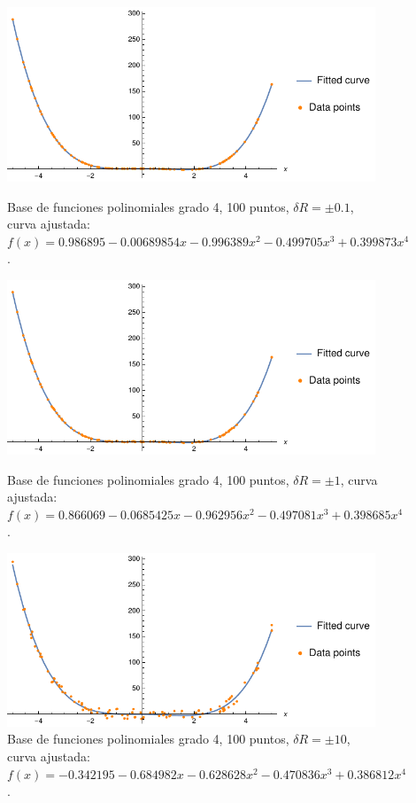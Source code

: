 \documentclass[11pt,letterpaper]{article}
\begin{document}
\begin{figure}
\centering
\includegraphics[width=11cm]{poly_04}
\caption{Base de funciones polinomiales grado 4, 100 puntos, $\delta R=\pm 0.1$,
curva ajustada: $f(x)=0.986895 - 0.00689854 x - 0.996389 x^2 - 0.499705 x^3 + 0.399873 x^4$.}
\includegraphics[width=11cm]{poly_05}
\caption{Base de funciones polinomiales grado 4, 100 puntos, $\delta R=\pm 1$,
curva ajustada: $f(x)=0.866069 - 0.0685425 x - 0.962956 x^2 - 0.497081 x^3 + 0.398685 x^4$.}
\includegraphics[width=11cm]{poly_06}
\caption{Base de funciones polinomiales grado 4, 100 puntos, $\delta R=\pm 10$,
curva ajustada: $f(x)=-0.342195 - 0.684982 x - 0.628628 x^2 - 0.470836 x^3 + 0.386812 x^4$.}
\label{fig:poly_100pts}
\end{figure}
\end{document}
